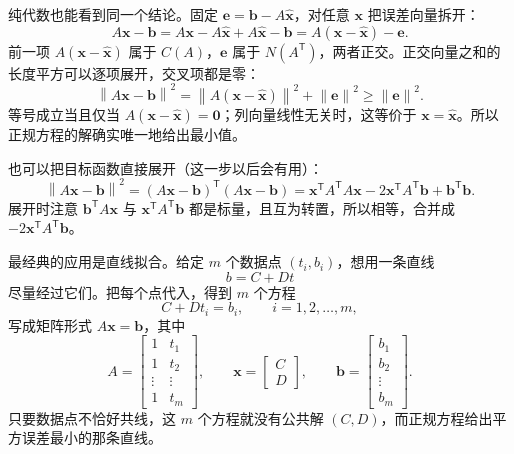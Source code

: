 \documentclass[UTF8,a4paper,12pt]{ctexart}
\numberwithin{equation}{section}
\newcommand{\norm}[1]{\left\lVert #1 \right\rVert}
\newcommand{\trans}{^{\mathsf T}}
\begin{document}
	纯代数也能看到同一个结论。固定 $\bm{e}=\bm{b}-A\hat{\bm{x}}$，对任意 $\bm{x}$ 把误差向量拆开：
	\begin{equation}\label{eq:6.56}
	A\bm{x}-\bm{b}
	=A\bm{x}-A\hat{\bm{x}}+A\hat{\bm{x}}-\bm{b}
	=A(\bm{x}-\hat{\bm{x}})-\bm{e}.
	\end{equation}
	前一项 $A(\bm{x}-\hat{\bm{x}})$ 属于 $C(A)$，$\bm{e}$ 属于 $N(A\trans)$，两者正交。正交向量之和的长度平方可以逐项展开，交叉项都是零：
	\begin{equation}\label{eq:6.57}
	\norm{A\bm{x}-\bm{b}}^2
	=\norm{A(\bm{x}-\hat{\bm{x}})}^2+\norm{\bm{e}}^2
	\ge \norm{\bm{e}}^2.
	\end{equation}
	等号成立当且仅当 $A(\bm{x}-\hat{\bm{x}})=\bm{0}$；列向量线性无关时，这等价于 $\bm{x}=\hat{\bm{x}}$。所以正规方程的解确实唯一地给出最小值。

	也可以把目标函数直接展开（这一步以后会有用）：
	\begin{equation}\label{eq:6.58}
	\norm{A\bm{x}-\bm{b}}^2
	=(A\bm{x}-\bm{b})\trans(A\bm{x}-\bm{b})
	=\bm{x}\trans A\trans A\bm{x}
	-2\bm{x}\trans A\trans\bm{b}
	+\bm{b}\trans\bm{b}.
	\end{equation}
	展开时注意 $\bm{b}\trans A\bm{x}$ 与 $\bm{x}\trans A\trans\bm{b}$ 都是标量，且互为转置，所以相等，合并成 $-2\bm{x}\trans A\trans\bm{b}$。

	最经典的应用是直线拟合。给定 $m$ 个数据点 $(t_i,b_i)$，想用一条直线
	\begin{equation}\label{eq:6.59}
	b=C+Dt
	\end{equation}
	尽量经过它们。把每个点代入，得到 $m$ 个方程
	\begin{equation}\label{eq:6.60}
	C+Dt_i=b_i,
	\qquad
	i=1,2,\ldots,m,
	\end{equation}
	写成矩阵形式 $A\bm{x}=\bm{b}$，其中
	\begin{equation}\label{eq:6.61}
	A=
	\begin{bmatrix}
		1&t_1\\
		1&t_2\\
		\vdots&\vdots\\
		1&t_m
	\end{bmatrix},
	\qquad
	\bm{x}=
	\begin{bmatrix}
		C\\
		D
	\end{bmatrix},
	\qquad
	\bm{b}=
	\begin{bmatrix}
		b_1\\
		b_2\\
		\vdots\\
		b_m
	\end{bmatrix}.
	\end{equation}
	只要数据点不恰好共线，这 $m$ 个方程就没有公共解 $(C,D)$，而正规方程给出平方误差最小的那条直线。
\end{document}

